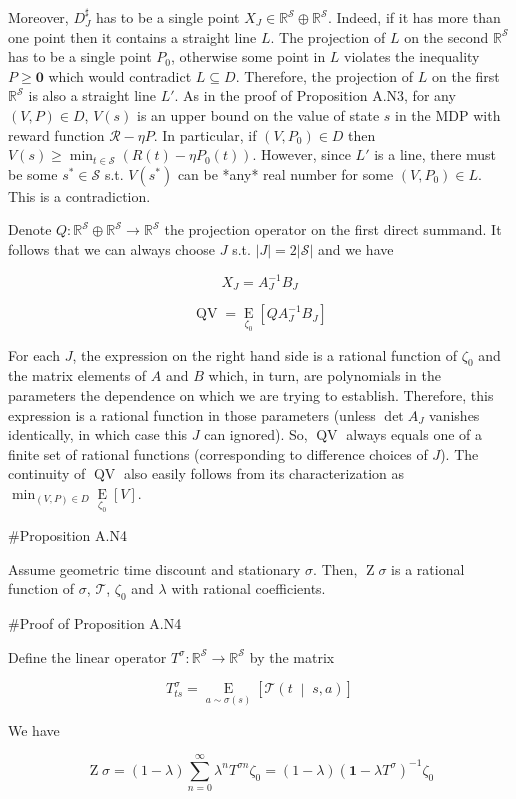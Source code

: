 \documentclass[a4paper]{article}
\newcommand{\AP}[1]{\left(#1\right)}
\newcommand{\AB}[1]{\left[#1\right]}
\newcommand{\APM}[2]{\left(#1\;\middle\vert\;#2\right)}
\newcommand{\Ea}[2]{\underset{#1}{\operatorname{E}}\AB{#2}}
\newcommand{\Reals}{\mathbb{R}}
\newcommand{\Abs}[1]{\left\vert #1 \right\vert}
\newcommand{\St}{\mathcal{S}}
\newcommand{\T}{\mathcal{T}}
\newcommand{\R}{\mathcal{R}}
\newcommand{\QV}{\operatorname{QV}}
\DeclareMathOperator{\Z}{Z}
\begin{document}
Moreover, $D_J^\sharp$ has to be a single point $X_J \in \Reals^\St \oplus \Reals^\St$. Indeed, if it has more than one point then it contains a straight line $L$. The projection of $L$ on the second $\Reals^\St$ has to be a single point $P_0$, otherwise some point in $L$ violates the inequality $P \geq \boldsymbol{0}$ which would contradict $L \subseteq D$. Therefore, the projection of $L$ on the first $\Reals^\St$ is also a straight line $L'$. As in the proof of Proposition A.N3, for any $(V,P) \in D$, $V(s)$ is an upper bound on the value of state $s$ in the MDP with reward function $\R-\eta P$. In particular, if $\AP{V,P_0} \in D$ then $V(s) \geq \min_{t\in\St} \AP{R(t)-\eta P_0(t)}$. However, since $L'$ is a line, there must be some $s^*\in\St$ s.t. $V\AP{s^*}$ can be *any* real number for some $\AP{V,P_0} \in L$. This is a contradiction.

Denote $Q: \Reals^\St \oplus \Reals^\St \rightarrow \Reals^\St$ the projection operator on the first direct summand. It follows that we can always choose $J$ s.t. $\Abs{J} = 2\Abs{\St}$ and we have

$$X_J = A_J^{-1} B_J$$

$$\QV = \Ea{\zeta_0}{QA_J^{-1} B_J}$$

For each $J$, the expression on the right hand side is a rational function of $\zeta_0$ and the matrix elements of $A$ and $B$ which, in turn, are polynomials in the parameters the dependence on which we are trying to establish.  Therefore, this expression is a rational function in those parameters (unless $\det A_J$ vanishes identically, in which case this $J$ can ignored). So, $\QV$ always equals one of a finite set of rational functions (corresponding to difference choices of $J$). The continuity of $\QV$ also easily follows from its characterization as $\min_{(V,P) \in D}{\Ea{\zeta_0}{V}}$.

\#Proposition A.N4

Assume geometric time discount and stationary $\sigma$. Then, $\Z\sigma$ is a rational function of $\sigma$, $\T$, $\zeta_0$ and $\lambda$ with rational coefficients.

\#Proof of Proposition A.N4

Define the linear operator $T^\sigma: \Reals^\St \rightarrow \Reals^\St$ by the matrix

$$T^\sigma_{ts} = \Ea{a\sim\sigma(s)}{\T\APM{t}{s,a}}$$

We have

$$\Z\sigma = (1-\lambda)\sum_{n=0}^\infty \lambda^n T^{\sigma n} \zeta_0 = (1-\lambda)\AP{\boldsymbol{1}-\lambda T^\sigma}^{-1}\zeta_0$$
\end{document}

